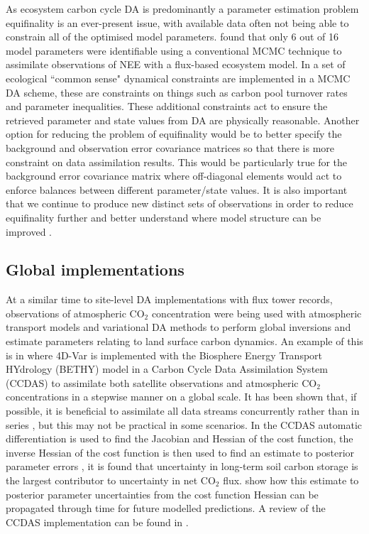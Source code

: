 \documentclass[12pt]{article}
\begin{document}
As ecosystem carbon cycle DA is predominantly a parameter estimation problem equifinality is an ever-present issue, with available data often not being able to constrain all of the optimised model parameters. \citet{Wu01012009} found that only 6 out of 16 model parameters were identifiable using a conventional MCMC technique to assimilate observations of NEE with a flux-based ecosystem model. In \citet{Bloom2015} a set of ecological ``common sense" dynamical constraints are implemented in a MCMC DA scheme, these are constraints on things such as carbon pool turnover rates and parameter inequalities. These additional constraints act to ensure the retrieved parameter and state values from DA are physically reasonable. Another option for reducing the problem of equifinality would be to better specify the background and observation error covariance matrices so that there is more constraint on data assimilation results. This would be particularly true for the background error covariance matrix where off-diagonal elements would act to enforce balances between different parameter/state values. It is also important that we continue to produce new distinct sets of observations in order to reduce equifinality further and better understand where model structure can be improved \citep{Carvalhais2010}.    



\subsection{Global implementations}

At a similar time to site-level DA implementations with flux tower records, observations of atmospheric CO\(_{2}\) concentration were being used with atmospheric transport models and variational DA methods to perform global inversions and estimate parameters relating to land surface carbon dynamics. An example of this is in \citet{rayner2005two} where 4D-Var is implemented with the Biosphere Energy Transport HYdrology (BETHY) model \citep{knorr2001uncertainties} in a Carbon Cycle Data Assimilation System (CCDAS) to assimilate both satellite observations and atmospheric CO\(_{2}\) concentrations in a stepwise manner on a global scale. It has been shown that, if possible, it is beneficial to assimilate all data streams concurrently rather than in series \citep{macbean2016consistent}, but this may not be practical in some scenarios. In the CCDAS automatic differentiation is used to find the Jacobian and Hessian of the cost function, the inverse Hessian of the cost function is then used to find an estimate to posterior parameter errors \citep{rayner2005two}, it is found that uncertainty in long-term soil carbon storage is the largest contributor to uncertainty in net CO\(_{2}\) flux. \citet{scholze2007propagating} show how this estimate to posterior parameter uncertainties from the cost function Hessian can be propagated through time for future modelled predictions. A review of the CCDAS implementation can be found in \citet{Kaminski2013}. 
\end{document}
